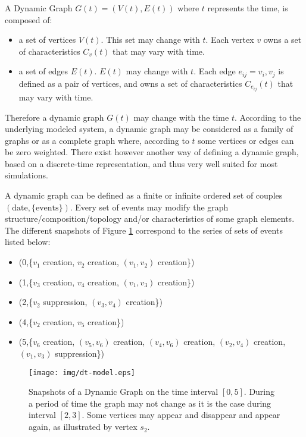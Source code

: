 \documentclass{svmult}
\begin{document}
A Dynamic Graph $G(t) = \left( V(t), E(t) \right)$ where $t$ represents the
time, is composed of:
\begin{itemize}
        \item a set of vertices $V(t)$. This set may change with $t$. Each
          vertex $v$ owns a set of characteristics $C_v(t)$ that may
          vary with time. 
        \item a set of edges $E(t)$. $E(t)$ may change with $t$.
          Each edge $e_{ij} = {v_i,v_j}$ is defined as a pair of vertices, and
          owns a set of characteristics $C_{e_{ij}}(t)$ that may vary with
          time. 
\end{itemize}

Therefore a dynamic graph $G(t)$ may change with the time $t$. According to
the underlying modeled system, a dynamic graph may be considered as a family
of graphs or as a complete graph where, according to $t$ some vertices or
edges can be zero weighted. 
There exist however another way of defining a dynamic graph, based on 
a discrete-time representation, and thus very well suited for most
simulations.

A dynamic graph can be defined as a finite or infinite ordered set of couples
$(\mbox{date}, \{\mbox{events}\})$. 
Every set of events may modify the graph structure/composition/topology and/or
characteristics of some graph elements.
The different snapshots of Figure \ref{fig:dt-model} correspond to the series
of sets of events listed below:

\begin{itemize}
\item[] (0,\{$v_1$ creation, $v_2$ creation, $(v_1,v_2)$ creation\})
\item[] (1,\{$v_3$ creation, $v_4$ creation, $(v_1,v_3)$ creation\})
\item[] (2,\{$v_2$ suppression, $(v_3,v_4)$ creation\})
\item[] (4,\{$v_2$ creation, $v_5$ creation\})
\item[] (5,\{$v_6$ creation, $(v_5,v_6)$ creation, $(v_4,v_6)$ creation, $(v_2,v_4)$ creation, $(v_1,v_3)$ suppression\})
\end{itemize}

\begin{figure}[h]
        \centering
                \texttt{[image: img/dt-model.eps]}
        \caption{Snapshots of a Dynamic Graph on the time interval
                $[0,5]$. During a period of time the graph may not change as
                it is the case during interval $[2,3]$. Some vertices may
                appear and disappear and appear again, as illustrated by
                vertex $s_2$.}
        \label{fig:dt-model}
\end{figure}
\end{document}
